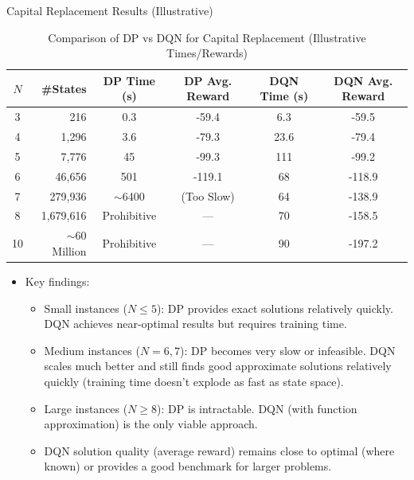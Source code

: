 \documentclass[10pt]{beamer}
\begin{document}

\begin{frame}{Capital Replacement Results (Illustrative)}
    \begin{table}
        \centering
        \scriptsize %
        \begin{tabular}{c r c c c c}
            \toprule
            $N$ & \#States & DP Time (s) & DP Avg. Reward & DQN Time (s) & DQN Avg. Reward \\
            \midrule
            3 & 216 & 0.3 & -59.4 & 6.3 & -59.5 \\
            4 & 1,296 & 3.6 & -79.3 & 23.6 & -79.4 \\
            5 & 7,776 & 45 & -99.3 & 111 & -99.2 \\
            6 & 46,656 & 501 & -119.1 & 68 & -118.9 \\
            7 & 279,936 & $\sim$6400 & (Too Slow) & 64 & -138.9 \\
            8 & 1,679,616 & Prohibitive & --- & 70 & -158.5 \\
            10 & $\sim$60 Million & Prohibitive & --- & 90 & -197.2 \\
            \bottomrule
        \end{tabular}
         \caption{Comparison of DP vs DQN for Capital Replacement (Illustrative Times/Rewards)}
    \end{table}

    \begin{itemize}
        \item Key findings:
        \begin{itemize}
            \item Small instances ($N \leq 5$): DP provides exact solutions relatively quickly. DQN achieves near-optimal results but requires training time.
            \item Medium instances ($N=6, 7$): DP becomes very slow or infeasible. DQN scales much better and still finds good approximate solutions relatively quickly (training time doesn't explode as fast as state space).
            \item Large instances ($N \geq 8$): DP is intractable. DQN (with function approximation) is the only viable approach.
            \item DQN solution quality (average reward) remains close to optimal (where known) or provides a good benchmark for larger problems.
        \end{itemize}
    \end{itemize}
\end{frame}
\end{document}
